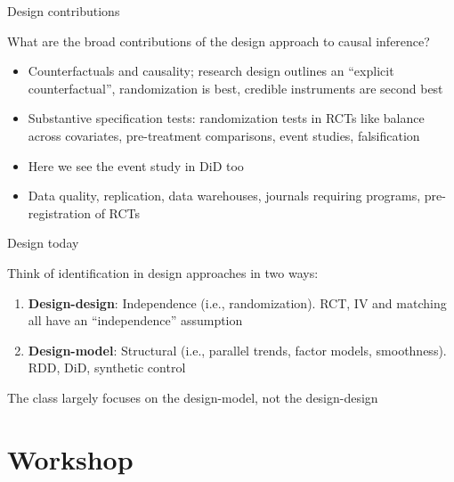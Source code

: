 \documentclass{beamer}
\begin{document}
\begin{frame}{Design contributions}

What are the broad contributions of the design approach to causal inference?

\begin{itemize}
\item Counterfactuals and causality; research design outlines an ``explicit counterfactual'', randomization is best, credible instruments are second best
\item Substantive specification tests: randomization tests in RCTs like balance across covariates, pre-treatment comparisons, event studies, falsification
\item Here we see the event study in DiD too
\item Data quality, replication, data warehouses, journals requiring programs, pre-registration of RCTs
\end{itemize}

\end{frame}

\begin{frame}{Design today}

Think of identification in design approaches in two ways:

	\begin{enumerate}
	\item \textbf{Design-design}: Independence (i.e., randomization). RCT, IV and matching all have an ``independence'' assumption
	\item \textbf{Design-model}: Structural (i.e., parallel trends, factor models, smoothness). RDD, DiD, synthetic control
	\end{enumerate}
	
The class largely focuses on the design-model, not the design-design


\end{frame}


\section{Workshop}
\end{document}
